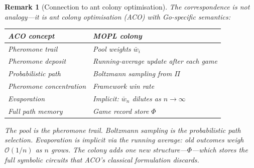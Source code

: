 \documentclass[11pt,a4paper]{article}
\newtheorem{remark}[theorem]{Remark}
\begin{document}
\begin{remark}[Connection to ant colony optimisation]%
\label{rem:aco}
\color{black!60}%
The correspondence is not analogy---it \emph{is}
ant colony optimisation (ACO) with Go-specific semantics:

\medskip
\begin{center}
\small
\begin{tabular}{@{}ll@{}}
\toprule
\textbf{ACO concept} & \textbf{MOPL colony} \\
\midrule
Pheromone trail     & Pool weights $\bar{w}_i$ \\
Pheromone deposit   & Running-average update after each game \\
Probabilistic path  & Boltzmann sampling from $\Pi$ \\
Pheromone concentration & Framework win rate \\
Evaporation         & Implicit: $\bar{w}_n$ dilutes as $n \to \infty$ \\
Full path memory    & Game record store $\Phi$ \\
\bottomrule
\end{tabular}
\end{center}

\medskip\noindent
The pool \emph{is} the pheromone trail.
Boltzmann sampling \emph{is} the probabilistic path selection.
Evaporation is implicit via the running average:
old outcomes weigh $\mathcal{O}(1/n)$ as $n$ grows.
The colony adds one new structure---$\Phi$---which
stores the full symbolic circuits that ACO's
classical formulation discards.
\end{remark}
\end{document}

